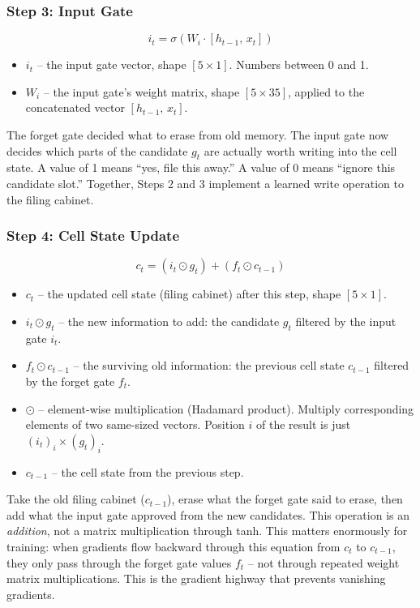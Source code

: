 \documentclass[12pt,a4paper]{article}
\begin{document}
\subsubsection{Step 3: Input Gate}

\[
i_t = \sigma(W_i \cdot [h_{t-1},\, x_t])
\]

\begin{itemize}
    \item $i_t$ -- the input gate vector, shape $[5 \times 1]$. Numbers between
    0 and 1.
    \item $W_i$ -- the input gate's weight matrix, shape $[5 \times 35]$, applied to
    the concatenated vector $[h_{t-1},\, x_t]$.
\end{itemize}

The forget gate decided what to erase from old memory. The input gate now decides
which parts of the candidate $g_t$ are actually worth writing into the cell state.
A value of 1 means ``yes, file this away.'' A value of 0 means ``ignore this
candidate slot.'' Together, Steps 2 and 3 implement a learned write operation to the
filing cabinet.

\subsubsection{Step 4: Cell State Update}

\[
c_t = (i_t \odot g_t) + (f_t \odot c_{t-1})
\]

\begin{itemize}
    \item $c_t$ -- the updated cell state (filing cabinet) after this step, shape
    $[5 \times 1]$.
    \item $i_t \odot g_t$ -- the new information to add: the candidate $g_t$ filtered
    by the input gate $i_t$.
    \item $f_t \odot c_{t-1}$ -- the surviving old information: the previous cell
    state $c_{t-1}$ filtered by the forget gate $f_t$.
    \item $\odot$ -- element-wise multiplication (Hadamard product). Multiply
    corresponding elements of two same-sized vectors. Position $i$ of the result
    is just $(i_t)_i \times (g_t)_i$.
    \item $c_{t-1}$ -- the cell state from the previous step.
\end{itemize}

Take the old filing cabinet ($c_{t-1}$), erase what the forget gate said to erase,
then add what the input gate approved from the new candidates. This operation is an
\textit{addition}, not a matrix multiplication through tanh. This matters enormously
for training: when gradients flow backward through this equation from $c_t$ to
$c_{t-1}$, they only pass through the forget gate values $f_t$ -- not through
repeated weight matrix multiplications. This is the gradient highway that prevents
vanishing gradients.
\end{document}
